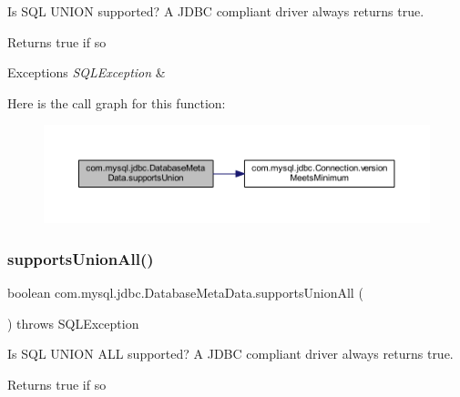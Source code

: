 Is S\+QL U\+N\+I\+ON supported? A J\+D\+BC compliant driver always returns true.

\begin{DoxyReturn}{Returns}
true if so 
\end{DoxyReturn}

\begin{DoxyExceptions}{Exceptions}
{\em S\+Q\+L\+Exception} & \\
\hline
\end{DoxyExceptions}
Here is the call graph for this function\+:
\nopagebreak
\begin{figure}[H]
\begin{center}
\leavevmode
\includegraphics[width=350pt]{classcom_1_1mysql_1_1jdbc_1_1_database_meta_data_ada9b430a38cf202e873a20eeb93613d2_cgraph}
\end{center}
\end{figure}
\mbox{\label{classcom_1_1mysql_1_1jdbc_1_1_database_meta_data_aa427bf7fc40cc3eaf41dff0398592c52}} 
\subsubsection{\texorpdfstring{supports\+Union\+All()}{supportsUnionAll()}}
{\footnotesize\ttfamily boolean com.\+mysql.\+jdbc.\+Database\+Meta\+Data.\+supports\+Union\+All (\begin{DoxyParamCaption}{ }\end{DoxyParamCaption}) throws S\+Q\+L\+Exception}

Is S\+QL U\+N\+I\+ON A\+LL supported? A J\+D\+BC compliant driver always returns true.

\begin{DoxyReturn}{Returns}
true if so 
\end{DoxyReturn}

